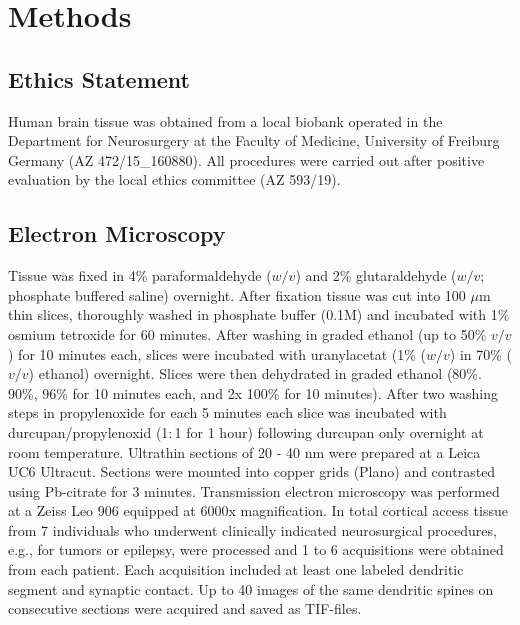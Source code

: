 \documentclass[fleqn,12pt]{wlscirep}
\begin{document}
\section*{Methods}

\subsection*{Ethics Statement}Human brain tissue was obtained from a local biobank operated in the Department for Neurosurgery at the Faculty of Medicine, University of Freiburg Germany (AZ 472/15\_160880). All procedures were carried out after positive evaluation by the local ethics committee (AZ 593/19). 

\subsection*{Electron Microscopy}
Tissue was fixed in 4\% paraformaldehyde ($w/v$) and 2\% glutaraldehyde ($w/v$; phosphate buffered saline) overnight. After fixation tissue was cut into 100 $\mu$m thin slices, thoroughly washed in phosphate buffer (0.1M) and incubated with 1\% osmium tetroxide for 60 minutes. After washing in graded ethanol (up to 50\% $v/v$) for 10 minutes each, slices were incubated with uranylacetat (1\% ($w/v$) in 70\% ($v/v$) ethanol) overnight. Slices were then dehydrated in graded ethanol (80\%. 90\%, 96\% for 10 minutes each, and 2x 100\% for 10 minutes). After two washing steps in propylenoxide for each 5 minutes each slice was incubated with durcupan/propylenoxid (1$:$1 for 1 hour) following durcupan only overnight at room temperature. Ultrathin sections of 20 - 40 nm were prepared at a Leica UC6 Ultracut. Sections were mounted into copper grids (Plano) and contrasted using Pb-citrate for 3 minutes. Transmission electron microscopy was performed at a Zeiss Leo 906 equipped at 6000x magnification. In total cortical access tissue from 7 individuals who underwent clinically indicated neurosurgical procedures, e.g., for tumors or epilepsy, were processed and 1 to 6 acquisitions were obtained from each patient. Each acquisition included at least one labeled dendritic segment and synaptic contact. Up to 40 images of the same dendritic spines on consecutive sections were acquired and saved as TIF-files. 
\end{document}
